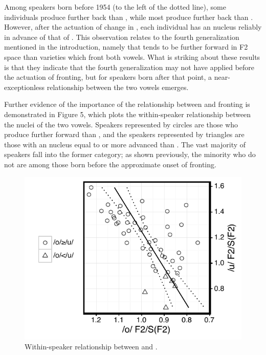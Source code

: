 \documentclass[12pt]{article}
\begin{document}
Among speakers born before 1954 (to the left of the dotted line), some individuals produce  further back than , while most produce  further back than . However, after the actuation of change in , each individual has an  nucleus reliably in advance of that of . This observation relates to the fourth generalization mentioned in the introduction, namely that  tends to be further forward in F2 space than  varieties which front both vowels. What is striking about these results is that they indicate that the fourth generalization may not have applied before the actuation of  fronting, but for speakers born after that point, a near-exceptionless relationship between the two vowels emerges.

Further evidence of the importance of the relationship between  and  fronting is demonstrated in Figure 5, which plots the within-speaker relationship between the nuclei of the two vowels. Speakers represented by circles are those who produce  further forward than , and the speakers represented by triangles are those with an  nucleus equal to or more advanced than . The vast majority of speakers fall into the former category; as shown previously, the minority who do not are among those born before the approximate onset of  fronting.

\vspace*{6pt}
\begin{figure}[H]
\centering
\includegraphics{owuwcorrelation.pdf}
\caption{Within-speaker relationship between  and .}
\end{figure}
\vspace*{6pt}
\end{document}
